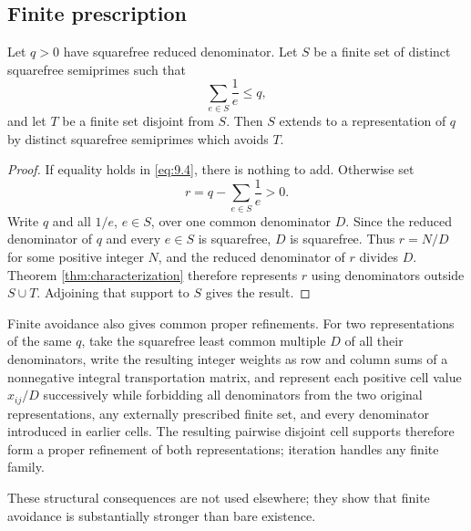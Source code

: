 \subsection{Finite prescription}

\begin{proposition}\label{prop:finite-prescription}
Let $q>0$ have squarefree reduced denominator. Let $S$ be a finite set of distinct squarefree semiprimes such that
\[
\sum_{e\in S}\frac1e\le q,
\tag{9.4}\label{eq:9.4}
\]
and let $T$ be a finite set disjoint from $S$. Then $S$ extends to a representation of $q$ by distinct squarefree semiprimes which avoids $T$.
\end{proposition}

\begin{proof}
If equality holds in \eqref{eq:9.4}, there is nothing to add. Otherwise set
\[
r=q-\sum_{e\in S}\frac1e>0.
\]
Write $q$ and all $1/e$, $e\in S$, over one common denominator $D$. Since the reduced denominator of $q$ and every $e\in S$ is squarefree, $D$ is squarefree. Thus $r=N/D$ for some positive integer $N$, and the reduced denominator of $r$ divides $D$. Theorem \ref{thm:characterization} therefore represents $r$ using denominators outside $S\cup T$. Adjoining that support to $S$ gives the result.
\end{proof}

\begin{remark}\label{rem:common-refinement}
Finite avoidance also gives common proper refinements. For two representations of the same $q$, take the squarefree least common multiple $D$ of all their denominators, write the resulting integer weights as row and column sums of a nonnegative integral transportation matrix, and represent each positive cell value $x_{ij}/D$ successively while forbidding all denominators from the two original representations, any externally prescribed finite set, and every denominator introduced in earlier cells. The resulting pairwise disjoint cell supports therefore form a proper refinement of both representations; iteration handles any finite family.
\end{remark}

These structural consequences are not used elsewhere; they show that finite avoidance is substantially stronger than bare existence.